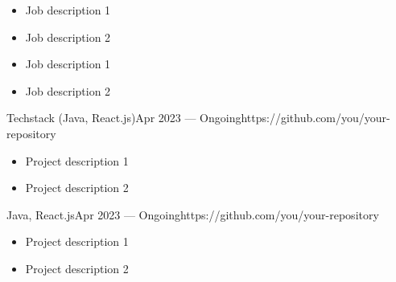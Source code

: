 \documentclass[10pt,a4paper,ragged2e,withhyper]{nextcv}
\begin{document}
\begin{paracol}{2}

\begin{itemize}
\item Job description 1
\item Job description 2
\end{itemize}

\divider%

\begin{itemize}
\item Job description 1
\item Job description 2
\end{itemize}

\medskip



{Techstack (Java, React.js)}{Apr 2023 --- Ongoing}{https://github.com/you/your-repository}
\begin{itemize}
  \item Project description 1
  \item Project description 2
\end{itemize}

\divider%

{Java, React.js}{Apr 2023 --- Ongoing}{https://github.com/you/your-repository}
\begin{itemize}
  \item Project description 1
  \item Project description 2
\end{itemize}

\medskip




\medskip



\newpage




\end{paracol}
\end{document}
